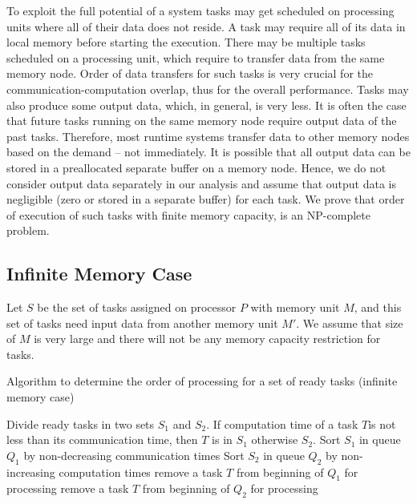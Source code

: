 \documentclass[runningheads]{llncs} %
\begin{document}
	To exploit the full potential of a system tasks may get scheduled on processing
	units where all of their data does not reside. A task may require all of its data
	in local memory before starting the execution. There may be multiple tasks
	scheduled on a processing unit, which require to transfer data from the same
	memory node. Order of data transfers for such tasks is very crucial for the
	communication-computation overlap, thus for the overall performance. Tasks may
	also produce some output data, which, in general, is very less.  It is often the case that future tasks running on the same memory node require output data of the past tasks. Therefore, most runtime systems transfer data to other memory nodes based on the demand -- not immediately. It is possible that all output data can be stored in a preallocated separate buffer on a memory node. Hence, we do not consider output data separately in our analysis and assume that output data is negligible (zero or stored in a separate buffer) for each task. We prove that order of execution of such tasks with finite memory capacity, is an NP-complete problem.
	
	
	\subsection{Infinite Memory Case}
	Let $S$ be the set of tasks assigned on processor $P$ with memory unit $M$, and this set of tasks  need input data from another memory unit $M'$. We assume that size of $M$ is very large and there will not be any memory capacity restriction for tasks.
	
	
	\begin{algorithm}
	\caption{\label{alg:OrderOfExecutionInfinteMemory}Algorithm to determine the order of processing for a set of ready tasks (infinite memory case)}
	\begin{algorithmic}[1]
		\STATE Divide ready tasks in two sets $S_1$ and $S_2$. If computation time of a task $T$is not less than its communication time, then $T$ is in $S_1$ otherwise $S_2$.
		\STATE Sort $S_1$ in queue $Q_1$ by non-decreasing communication times
		\STATE Sort $S_2$ in queue $Q_2$ by non-increasing computation times
		\STATE remove a task $T$ from beginning of $Q_1$ for processing
		\ELSE 
		\STATE remove a task $T$ from beginning of $Q_2$ for processing
		\ENDIF
		\ENDWHILE
	\end{algorithmic}
\end{algorithm}
	
\end{document}
